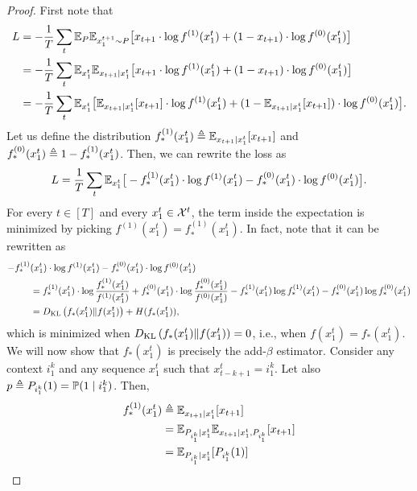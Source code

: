 \begin{proof}
First note that
\begin{align*}
L &= -\frac{1}{T} \sum_t \mathbb{E}_P \mathbb{E}_{x_1^{t+1} \sim P}\big[x_{t+1} \cdot \log f^{(1)} (x_1^t) + (1- x_{t+1}) \cdot \log f^{(0)}(x_1^t) \big] \\
&= -\frac{1}{T} \sum_t \mathbb{E}_{x_1^t} \mathbb{E}_{x_{t+1}|x_1^t} \big[x_{t+1} \cdot \log f^{(1)} (x_1^t) + (1- x_{t+1}) \cdot \log f^{(0)}(x_1^t) \big] \\
&= -\frac{1}{T} \sum_t \mathbb{E}_{x_1^t} \big[\mathbb{E}_{x_{t+1}|x_1^t}[x_{t+1}] \cdot \log f^{(1)} (x_1^t) + (1- \mathbb{E}_{x_{t+1}|x_1^t}[x_{t+1}]) \cdot \log f^{(0)}(x_1^t) \big].
\end{align*}
Let us define the distribution $f_*^{(1)}(x_1^t) \triangleq \mathbb{E}_{x_{t+1}|x_1^t}[x_{t+1}]$ and $f_*^{(0)}(x_1^t) \triangleq 1 - f_*^{(1)}(x_1^t)$. Then, we can rewrite the loss as
\begin{equation*}
L = \frac{1}{T} \sum_t \mathbb{E}_{x_1^t} \big[-f_*^{(1)}(x_1^t) \cdot \log f^{(1)} (x_1^t) - f_*^{(0)}(x_1^t) \cdot \log f^{(0)}(x_1^t) \big].
\end{equation*}
For every $t \in [T]$ and every $x_1^t \in \mathcal{X}^t$, the term inside the expectation is minimized by picking $f^{(1)}(x_1^t) = f^{(1)}_*(x_1^t)$. In fact, note that it can be rewritten as
\begin{align*}
-f_*^{(1)}&(x_1^t) \cdot \log f^{(1)} (x_1^t) - f_*^{(0)}(x_1^t) \cdot \log f^{(0)}(x_1^t) \notag\\
&= f_*^{(1)}(x_1^t) \cdot \log \frac{f_*^{(1)}(x_1^t)}{f^{(1)} (x_1^t)} + f_*^{(0)}(x_1^t) \cdot \log \frac{f_*^{(0)}(x_1^t)}{f^{(0)}(x_1^t)} - f_*^{(1)}(x_1^t)\log f_*^{(1)}(x_1^t) - f_*^{(0)}(x_1^t) \log f_*^{(0)}(x_1^t) \\
&= D_{\rm KL}\left(f_*(x_1^t) \| f(x_1^t)\right) + H(f_*(x_1^t)),
\end{align*}
which is minimized when $D_{\rm KL}\left(f_*(x_1^t) \| f(x_1^t)\right) = 0$, i.e., when $f(x_1^t) = f_*(x_1^t)$. We will now show that $f_*(x_1^t)$ is precisely the add-$\beta$ estimator. Consider any context $i_1^k$ and any sequence $x_1^t$ such that $x_{t-k+1}^t = i_1^k$. Let also $p \triangleq P_{i_1^k}(1) = \mathbb{P}(1\mid i_1^k)$. Then, 
\begin{align*}
f_*^{(1)}(x_1^t) &\define \Expect_{x_{t+1}|x_1^t}[x_{t+1}] \\
&= \Expect_{P_{i_1^k} | x_1^t} \Expect_{x_{t+1}|x_1^t, P_{i_1^k}}[x_{t+1}] \\
&= \Expect_{P_{i_1^k} | x_1^t} [P_{i_1^k}(1)] \\

\end{align*}
\end{proof}
